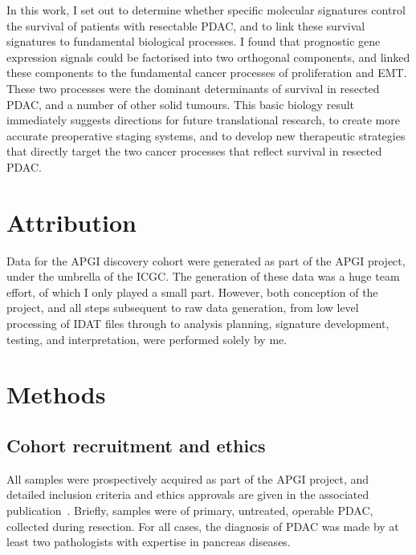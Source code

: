 \documentclass[dissertation.tex]{subfiles}
\begin{document}
In this work, I set out to determine whether specific molecular signatures control the survival of patients with resectable \gls{PDAC}, and to link these survival signatures to fundamental biological processes.  I found that prognostic gene expression signals could be factorised into two orthogonal components, and linked these components to the fundamental cancer processes of proliferation and \gls{EMT}.  These two processes were the dominant determinants of survival in resected \gls{PDAC}, and a number of other solid tumours.  This basic biology result immediately suggests directions for future translational research, to create more accurate preoperative staging systems, and to develop new therapeutic strategies that directly target the two cancer processes that reflect survival in resected \gls{PDAC}.

\section{Attribution}
Data for the \gls{APGI} discovery cohort were generated as part of the \gls{APGI} project, under the umbrella of the \gls{ICGC}.  The generation of these data was a huge team effort, of which I only played a small part.  However, both conception of the project, and all steps subsequent to raw data generation, from low level processing of \gls{IDAT} files through to analysis planning, signature development, testing, and interpretation, were performed solely by me.

\section{Methods}
\subsection{Cohort recruitment and ethics}
All samples were prospectively acquired as part of the \gls{APGI} project, and detailed inclusion criteria and ethics approvals are given in the associated publication~\cite{Biankin2012}.  Briefly, samples were of primary, untreated, operable \gls{PDAC}, collected during resection.  For all cases, the diagnosis of \gls{PDAC} was made by at least two pathologists with expertise in pancreas diseases.
\end{document}
